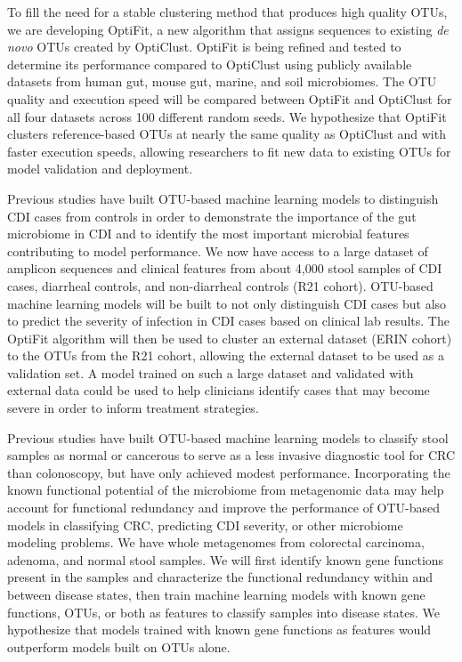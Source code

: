 \documentclass[11pt]{article}
\begin{document}
To fill the need for a stable clustering method that produces high quality OTUs,
we are developing OptiFit, a new algorithm that assigns sequences to
existing \textit{de novo} OTUs created by OptiClust.
OptiFit is being refined and tested to determine its performance compared to
OptiClust using publicly available datasets from human gut, mouse gut, marine,
and soil microbiomes.
The OTU quality and execution speed will be compared between OptiFit and
OptiClust for all four datasets across 100 different random seeds.
We hypothesize that OptiFit clusters reference-based OTUs at nearly the same 
quality as OptiClust and with faster execution speeds, allowing researchers to 
fit new data to existing OTUs for model validation and deployment.

Previous studies have built OTU-based machine learning models to distinguish CDI
cases from controls in order to demonstrate the importance of the gut microbiome
in CDI and to identify the most important microbial features contributing to
model performance.
We now have access to a large dataset of amplicon sequences and
clinical features from about 4,000 stool samples of CDI cases, diarrheal
controls, and non-diarrheal controls (R21 cohort).
OTU-based machine learning models will be built to not only distinguish CDI
cases but also to predict the severity of infection in CDI cases based on
clinical lab results.
The OptiFit algorithm will then be used to cluster an external dataset (ERIN
cohort) to the OTUs from the R21 cohort, allowing the external dataset to be
used as a validation set.
A model trained on such a large dataset and validated with external data could
be used to help clinicians identify cases that may become severe in order to
inform treatment strategies.

Previous studies have built OTU-based machine learning models to classify stool
samples as normal or cancerous to serve as a less invasive diagnostic tool for
CRC than colonoscopy, but have only achieved modest performance.
Incorporating the known functional potential of the microbiome from metagenomic
data may help account for functional redundancy and improve the performance of
OTU-based models in classifying CRC, predicting CDI severity, or other 
microbiome modeling problems.
We have whole metagenomes from colorectal carcinoma, adenoma, and normal stool
samples.
We will first identify known gene functions present in the samples and
characterize the functional redundancy within and between disease states, then
train machine learning models with known gene functions, OTUs, or both as
features to classify samples into disease states.
We hypothesize that models trained with known gene functions as features 
would outperform models built on OTUs alone.
\end{document}
